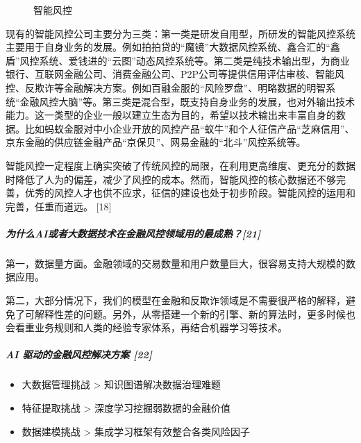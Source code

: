 \documentclass[letterpaper,10pt,english]{sphinxmanual}
\begin{document}
\begin{figure}[H]
\centering
\capstart

\noindent{}
\caption{智能风控}\label{\detokenize{chapter_project/AI_Finance:id36}}\end{figure}

现有的智能风控公司主要分为三类：第一类是研发自用型，所研发的智能风控系统主要用于自身业务的发展。例如拍拍贷的“魔镜”大数据风控系统、鑫合汇的“鑫盾”风控系统、爱钱进的“云图”动态风控系统等。第二类是纯技术输出型，为商业银行、互联网金融公司、消费金融公司、P2P公司等提供信用评估审核、智能风控、反欺诈等金融解决方案。例如百融金服的“风险罗盘”、明略数据的明智系统“金融风控大脑”等。第三类是混合型，既支持自身业务的发展，也对外输出技术能力。这一类型的企业一般以建立生态为目的，希望以技术输出来丰富自身的数据。比如蚂蚁金服对中小企业开放的风控产品“蚁牛”和个人征信产品“芝麻信用”、京东金融的供应链金融产品“京保贝”、网易金融的“北斗”风控系统等。

智能风控一定程度上确实突破了传统风控的局限，在利用更高维度、更充分的数据时降低了人为的偏差，减少了风控的成本。然而，智能风控的核心数据还不够完善，优秀的风控人才也供不应求，征信的建设也处于初步阶段。智能风控的运用和完善，任重而道远。
{[}18{]}


\subparagraph{为什么AI或者大数据技术在金融风控领域用的最成熟？{[}21{]}}
\label{\detokenize{chapter_project/AI_Finance:ai-21}}
第一，数据量方面。金融领域的交易数量和用户数量巨大，很容易支持大规模的数据应用。

第二，大部分情况下，我们的模型在金融和反欺诈领域是不需要很严格的解释，避免了可解释性差的问题。另外，从零搭建一个新的引擎、新的算法时，更多时候也会看重业务规则和人类的经验专家体系，再结合机器学习等技术。


\subparagraph{AI 驱动的金融风控解决方案 {[}22{]}}
\label{\detokenize{chapter_project/AI_Finance:ai-22}}\begin{itemize}
\item {} 
大数据管理挑战 \sphinxhyphen{}> 知识图谱解决数据治理难题

\item {} 
特征提取挑战 \sphinxhyphen{}> 深度学习挖掘弱数据的金融价值

\item {} 
数据建模挑战 \sphinxhyphen{}> 集成学习框架有效整合各类风险因子

\end{itemize}
\end{document}
